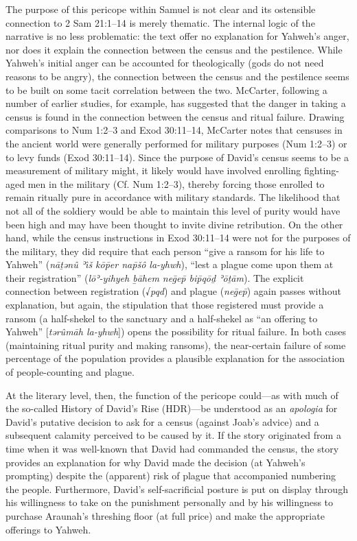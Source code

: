  The purpose of this pericope within Samuel is not clear and its ostensible connection to 2 Sam 21:1--14 is merely thematic.\autocite[509]{mccarter1984} The internal logic of the narrative is no less problematic: the text offer no explanation for Yahweh's anger, nor does it explain the connection between the census and the pestilence. While Yahweh's initial anger can be accounted for theologically (gods do not need reasons to be angry), the connection between the census and the pestilence seems to be built on some tacit correlation between the two. McCarter, following a number of earlier studies, for example, has suggested that the danger in taking a census is found in the connection between the census and ritual failure. Drawing comparisons to Num 1:2--3 and Exod 30:11--14, McCarter notes that censuses in the ancient world were generally performed for military purposes (Num 1:2--3) or to levy funds (Exod 30:11--14). Since the purpose of David's census seems to be a measurement of military might, it likely would have involved enrolling fighting-aged men in the military (Cf. Num 1:2--3), thereby forcing those enrolled to remain ritually pure in accordance with military standards. The likelihood that not all of the soldiery would be able to maintain this level of purity would have been high and may have been thought to invite divine retribution. On the other hand, while the census instructions in Exod 30:11--14 were not for the purposes of the military, they did require that each person ``give a ransom for his life to Yahweh'' (\emph{nāṯənû ʾı̂š kōp̄er nap̄šô la-yhwh}), ``lest a plague come upon them at their registration'' (\emph{lōʾ-yihyeh ḇāhem neḡep̄ bip̄qōḏ ʾōṯām}). The explicit connection between registration (√\emph{pqd}) and plague (\emph{neḡep̄}) again passes without explanation, but again, the stipulation that those registered must provide a ransom (a half-shekel to the sanctuary and a half-shekel as ``an offering to Yahweh'' {[}\emph{tərûmāh la-yhwh}{]}) opens the possibility for ritual failure. In both cases (maintaining ritual purity and making ransoms), the near-certain failure of some percentage of the population provides a plausible explanation for the association of people-counting and plague. 

 At the literary level, then, the function of the pericope could---as with much of the so-called History of David's Rise (HDR)---be understood as an \emph{apologia} for David's putative decision to ask for a census (against Joab's advice) and a subsequent calamity perceived to be caused by it. If the story originated from a time when it was well-known that David had commanded the census, the story provides an explanation for why David made the decision (at Yahweh's prompting) despite the (apparent) risk of plague that accompanied numbering the people.\autocite[518]{mccarter1984} Furthermore, David's self-sacrificial posture is put on display through his willingness to take on the punishment personally and by his willingness to purchase Araunah's threshing floor (at full price) and make the appropriate offerings to Yahweh. 

